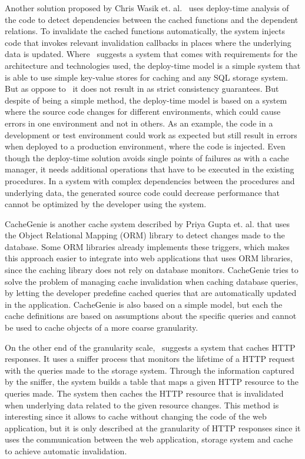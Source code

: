 Another solution proposed by Chris Wasik et. al.~\cite{paper:deploy-time} uses deploy-time analysis of the code to detect dependencies between the cached functions and the dependent relations. To invalidate the cached functions automatically, the system injects code that invokes relevant invalidation callbacks in places where the underlying data is updated. Where~\cite{paper:liskov} suggests a system that comes with requirements for the architecture and technologies used, the deploy-time model is a simple system that is able to use simple key-value stores for caching and any SQL storage system. But as oppose to~\cite{paper:liskov} it does not result in as strict consistency guarantees. But despite of being a simple method, the deploy-time model is based on a system where the source code changes for different environments, which could cause errors in one environment and not in others. As an example, the code in a development or test environment could work as expected but still result in errors when deployed to a production environment, where the code is injected. Even though the deploy-time solution avoids single points of failures as with a cache manager, it needs additional operations that have to be executed in the existing procedures. In a system with complex dependencies between the procedures and underlying data, the generated source code could decrease performance that cannot be optimized by the developer using the system.

CacheGenie is another cache system described by Priya Gupta et. al. that uses the Object Relational Mapping (ORM) library to detect changes made to the database. Some ORM libraries already implements these triggers, which makes this approach easier to integrate into web applications that uses ORM libraries, since the caching library does not rely on database monitors. CacheGenie tries to solve the problem of managing cache invalidation when caching database queries, by letting the developer predefine cached queries that are automatically updated in the application. CacheGenie is also based on a simple model, but each the cache definitions are based on assumptions about the specific queries and cannot be used to cache objects of a more coarse granularity.

On the other end of the granularity scale,~\cite{paper:db-driven-http} suggests a system that caches HTTP responses. It uses a sniffer process that monitors the lifetime of a HTTP request with the queries made to the storage system. Through the information captured by the sniffer, the system builds a table that maps a given HTTP resource to the queries made. The system then caches the HTTP resource that is invalidated when underlying data related to the given resource changes. This method is interesting since it allows to cache without changing the code of the web application, but it is only described at the granularity of HTTP responses since it uses the communication between the web application, storage system and cache to achieve automatic invalidation.

